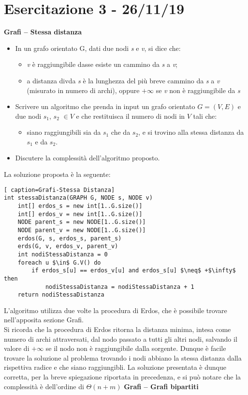 \documentclass[../cheatSheetAlgoritmi.tex]{subfiles}
\begin{document}
\section{Esercitazione 3 - 26/11/19}
\textbf{Grafi – Stessa distanza}

\begin{itemize}
\item In un grafo orientato G, dati due nodi \textit{s} e \textit{v}, si dice che:
	\begin{itemize}
		\item \textit{v} è raggiungibile dasse esiste un cammino da \textit{s} a \textit{v};
		\item a distanza divda \textit{s} è la lunghezza del più breve cammino da \textit{s} a \textit{v} (misurato in numero di archi), oppure $+\infty$ se \textit{v} non è raggiungibile da \textit{s}
	\end{itemize}
	
	\item Scrivere un algoritmo che prenda in input un grafo orientato $G=(V, E)$ e due nodi $s_1$, $s_2$ $\in V$ e che restituisca il numero di nodi in $V$ tali che:
	\begin{itemize}
		\item siano raggiungibili sia da $s_1$ che da $s_2$, e si trovino alla stessa distanza da $s_1$ e da $s_2$.
	\end{itemize}
	\item Discutere la complessità dell’algoritmo proposto.
\end{itemize}
La soluzione proposta è la seguente:
\begin{lstlisting}[ caption=Grafi-Stessa Distanza]
int stessaDistanza(GRAPH G, NODE s, NODE v)
	int[] erdos_s = new int[1..G.size()]
  	int[] erdos_v = new int[1..G.size()]
  	NODE parent_s = new NODE[1..G.size()]
 	NODE parent_v = new NODE[1..G.size()]
 	erdos(G, s, erdos_s, parent_s)
 	erds(G, v, erdos_v, parent_v)
  	int nodiStessaDistanza = 0
  	foreach u $\in$ G.V() do
    	if erdos_s[u] == erdos_v[u] and erdos_s[u] $\neq$ +$\infty$ then
      		nodiStessaDistanza = nodiStessaDistanza + 1
  	return nodiStessaDistanza
\end{lstlisting}
L'algoritmo utilizza due volte la procedura di Erdos, che è possibile trovare nell'apposita sezione Grafi. \\ Si ricorda che la procedura di Erdos ritorna la distanza minima, intesa come numero di archi attraversati, dal nodo passato a tutti gli altri nodi, salvando il valore di $+\infty$ se il nodo non è raggiungibile dalla sorgente. Dunque è facile trovare la soluzione al problema trovando i nodi abbiano la stessa distanza dalla rispettiva radice e che siano raggiungibli.
La soluzione presentata è dunque corretta, per la breve spiegazione riportata in precedenza, e si può notare che la complessità è dell'ordine di $\Theta(n + m)$ 
\newpage
\textbf{Grafi – Grafi bipartiti}
\end{document}

